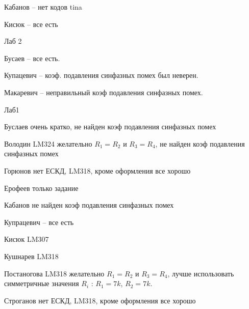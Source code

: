 \documentclass[a4paper,11pt]{article}
\begin{document}
Кабанов -- нет кодов tina

Кисюк -- все есть

\newpage
Лаб 2

Бусаев -- все есть.

Купацевич -- коэф. подавления синфазных помех был неверен.

Макаревич -- неправильный коэф подавления синфазных помех.

\newpage
Лаб1 

Буслаев  очень кратко, не найден коэф подавления синфазных помех

Володин LM324  желательно $R_1=R_2$ и $R_3=R_4$, не найден коэф подавления синфазных помех

Горюнов  нет ЕСКД, LM318, кроме оформления все хорошо

Ерофеев только задание

Кабанов  не найден коэф подавления синфазных помех

Купрацевич -- все есть

Кисюк LM307

Кушнарев LM318

Постаногова LM318 желательно $R_1=R_2$ и $R_3=R_4$, лучше использовать симметричные значения $R_i$ : $R_1=7k$, $R_2=7k$. 

Строганов нет ЕСКД, LM318, кроме оформления все хорошо
\end{document}
